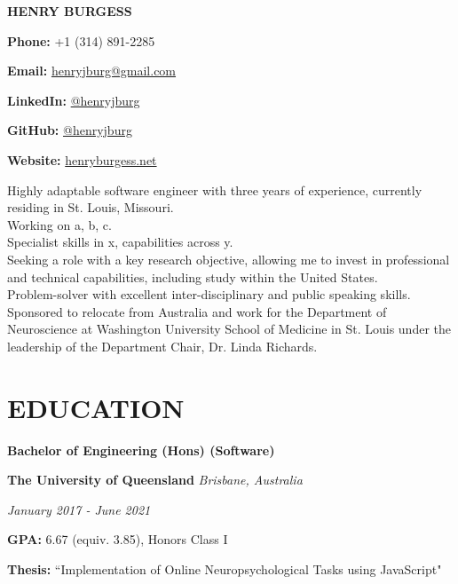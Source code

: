\documentclass{article}
\begin{document}
  {\Huge\textbf{\uppercase{Henry Burgess}}}\hfill\begin{minipage}{0.26\linewidth}

  \textbf{Phone:} +1 (314) 891-2285

  \textbf{Email:} \href{mailto:henryjburg@gmail.com}{\color{blue}henryjburg@gmail.com}

  \textbf{LinkedIn:} \href{https://www.linkedin.com/in/henryjburg/}{\color{blue}@henryjburg}

  \textbf{GitHub:} \href{https://github.com/henryjburg}{\color{blue}@henryjburg}

  \textbf{Website:} \href{https://henryburgess.net/}{\color{blue}henryburgess.net}

  \end{minipage}

  \medbreak

  Highly adaptable software engineer with three years of experience, currently residing in St. Louis, Missouri. \\
  Working on a, b, c. \\
  Specialist skills in x, capabilities across y. \\
  Seeking a role with a key research objective, allowing me to invest in professional and technical capabilities, including study within the United States. \\
  Problem-solver with excellent inter-disciplinary and public speaking skills. \\
  Sponsored to relocate from Australia and work for the Department of Neuroscience at Washington University School of Medicine in St. Louis under the leadership of the Department Chair, Dr. Linda Richards.

  \section*{\centering\uppercase{Education}}

  {\large\textbf{Bachelor of Engineering (Hons) (Software)}}

  \medbreak

  \textbf{The University of Queensland} \hfill \textit{Brisbane, Australia}

  \textit{January 2017 - June 2021}

  \textbf{GPA:} 6.67 (equiv. 3.85), Honors Class I

  \textbf{Thesis:} ``Implementation of Online Neuropsychological Tasks using JavaScript"
\end{document}
